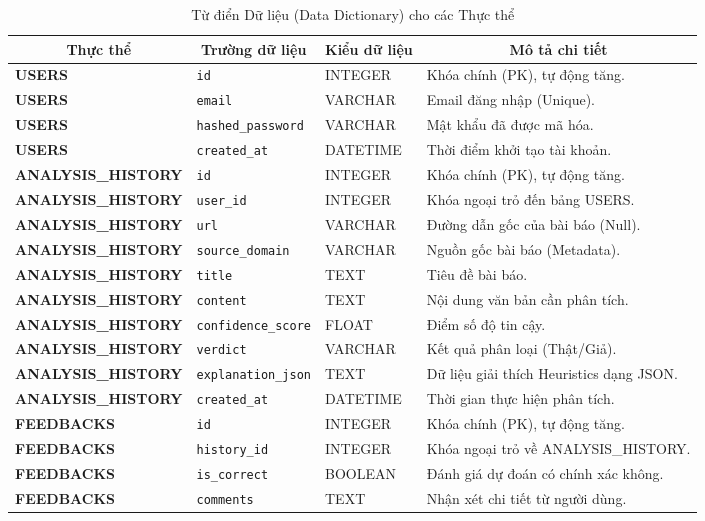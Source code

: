 \documentclass[12pt,a4paper]{article}
\begin{document}
\begin{table}[H]
\centering
\caption{Từ điển Dữ liệu (Data Dictionary) cho các Thực thể}
\label{tab:data_dictionary}
\begin{tabularx}{\textwidth}{|l|l|l|X|}
\hline
\multicolumn{1}{|c|}{\textbf{Thực thể}} & \multicolumn{1}{c|}{\textbf{Trường dữ liệu}} & \multicolumn{1}{c|}{\textbf{Kiểu dữ liệu}} & \multicolumn{1}{c|}{\textbf{Mô tả chi tiết}} \\
\hline
\textbf{USERS} & \texttt{id} & INTEGER & Khóa chính (PK), tự động tăng. \\
\hline
\textbf{USERS} & \texttt{email} & VARCHAR & Email đăng nhập (Unique). \\
\hline
\textbf{USERS} & \texttt{hashed\_password} & VARCHAR & Mật khẩu đã được mã hóa. \\
\hline
\textbf{USERS} & \texttt{created\_at} & DATETIME & Thời điểm khởi tạo tài khoản. \\
\hline
\textbf{ANALYSIS\_HISTORY} & \texttt{id} & INTEGER & Khóa chính (PK), tự động tăng. \\
\hline
\textbf{ANALYSIS\_HISTORY} & \texttt{user\_id} & INTEGER & Khóa ngoại trỏ đến bảng USERS. \\
\hline
\textbf{ANALYSIS\_HISTORY} & \texttt{url} & VARCHAR & Đường dẫn gốc của bài báo (Null). \\
\hline
\textbf{ANALYSIS\_HISTORY} & \texttt{source\_domain} & VARCHAR & Nguồn gốc bài báo (Metadata). \\
\hline
\textbf{ANALYSIS\_HISTORY} & \texttt{title} & TEXT & Tiêu đề bài báo. \\
\hline
\textbf{ANALYSIS\_HISTORY} & \texttt{content} & TEXT & Nội dung văn bản cần phân tích. \\
\hline
\textbf{ANALYSIS\_HISTORY} & \texttt{confidence\_score} & FLOAT & Điểm số độ tin cậy. \\
\hline
\textbf{ANALYSIS\_HISTORY} & \texttt{verdict} & VARCHAR & Kết quả phân loại (Thật/Giả). \\
\hline
\textbf{ANALYSIS\_HISTORY} & \texttt{explanation\_json} & TEXT & Dữ liệu giải thích Heuristics dạng JSON. \\
\hline
\textbf{ANALYSIS\_HISTORY} & \texttt{created\_at} & DATETIME & Thời gian thực hiện phân tích. \\
\hline
\textbf{FEEDBACKS} & \texttt{id} & INTEGER & Khóa chính (PK), tự động tăng. \\
\hline
\textbf{FEEDBACKS} & \texttt{history\_id} & INTEGER & Khóa ngoại trỏ về ANALYSIS\_HISTORY. \\
\hline
\textbf{FEEDBACKS} & \texttt{is\_correct} & BOOLEAN & Đánh giá dự đoán có chính xác không. \\
\hline
\textbf{FEEDBACKS} & \texttt{comments} & TEXT & Nhận xét chi tiết từ người dùng. \\
\hline
\end{tabularx}
\end{table}
\end{document}
